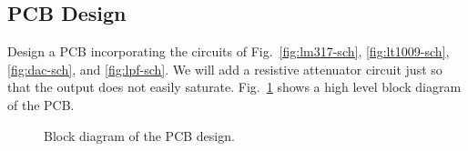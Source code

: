 \documentclass[letterpaper, 11pt]{article}
\begin{document}
	

\subsection{PCB Design}

Design a PCB incorporating the circuits of Fig.~\ref{fig:lm317-sch}, \ref{fig:lt1009-sch}, \ref{fig:dac-sch}, and \ref{fig:lpf-sch}. We will add a resistive attenuator circuit just so that the output does not easily saturate. Fig.~\ref{fig:pcb-block} shows a high level block diagram of the PCB.


\begin{figure}[ht]
	\centering
	\caption{Block diagram of the PCB design.}
	\label{fig:pcb-block}
\end{figure}
\end{document}
